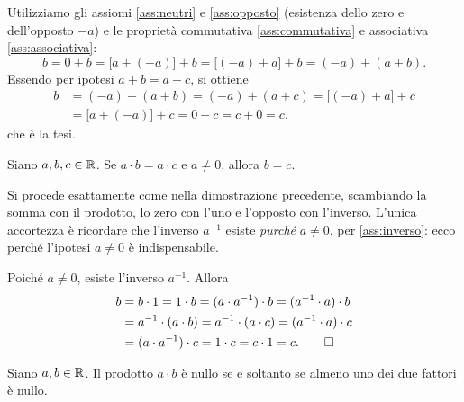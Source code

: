 \begin{dimostrazione}
Utilizziamo gli assiomi \ref{ass:neutri} e \ref{ass:opposto} (esistenza dello zero e
dell'opposto $-a$) e le proprietà commutativa \ref{ass:commutativa} e associativa
\ref{ass:associativa}:
\[
  b = 0+b = \bigl[a+(-a)\bigr]+b = \bigl[(-a)+a\bigr]+b = (-a)+(a+b).
\]
Essendo per ipotesi $a+b=a+c$, si ottiene
\begin{align*}
  b &= (-a)+(a+b) = (-a)+(a+c) = \bigl[(-a)+a\bigr]+c \\
    &= \bigl[a+(-a)\bigr]+c = 0+c = c+0 = c,
\end{align*}
che è la tesi.
\end{dimostrazione}

\begin{proposizione}\label{prop:semplificazione-prodotto}
Siano $a,b,c\in\mathbb{R}$. Se $a\cdot b=a\cdot c$ e $a\neq0$, allora $b=c$.
\end{proposizione}

\begin{schema}
\end{schema}

\begin{strategia}
Si procede esattamente come nella dimostrazione precedente, scambiando la somma con il
prodotto, lo zero con l'uno e l'opposto con l'inverso. L'unica accortezza è ricordare
che l'inverso $a^{-1}$ esiste \emph{purché} $a\neq0$, per \ref{ass:inverso}: ecco
perché l'ipotesi $a\neq0$ è indispensabile.
\end{strategia}

\begin{dimostrazione}
Poiché $a\neq0$, esiste l'inverso $a^{-1}$. Allora
\begin{align*}
  b &= b\cdot1 = 1\cdot b = (a\cdot a^{-1})\cdot b = (a^{-1}\cdot a)\cdot b \\
    &= a^{-1}\cdot(a\cdot b) = a^{-1}\cdot(a\cdot c) = (a^{-1}\cdot a)\cdot c \\
    &= (a\cdot a^{-1})\cdot c = 1\cdot c = c\cdot 1 = c. \qedhere
\end{align*}
\end{dimostrazione}

\begin{proposizione}\label{prop:annullamento}
Siano $a,b\in\mathbb{R}$. Il prodotto $a\cdot b$ è nullo se e soltanto se almeno uno dei due
fattori è nullo.
\end{proposizione}

